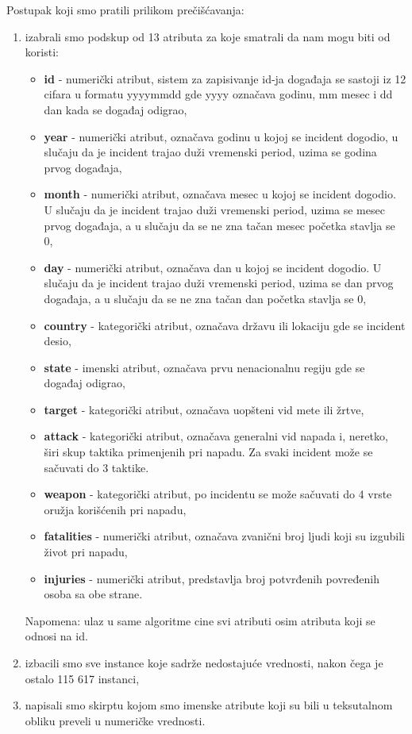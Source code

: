 \documentclass[a4paper]{article}
\begin{document}
Postupak koji smo pratili prilikom prečišćavanja:
\begin{enumerate} 
	\item izabrali smo podskup od 13 atributa za koje smatrali da nam mogu biti od koristi: 
	\begin{itemize}
		\item \textbf{id} - numerički atribut, sistem za zapisivanje id-ja događaja se sastoji iz 12 cifara u formatu yyyymmdd gde yyyy označava godinu, mm mesec i dd dan kada se događaj odigrao,
		\item \textbf{year} - numerički atribut, označava godinu u kojoj se incident dogodio, u slučaju da je incident trajao duži vremenski period, uzima se godina prvog događaja,
		\item \textbf{month} - numerički atribut, označava mesec u kojoj se incident dogodio. U slučaju da je incident trajao duži vremenski period, uzima se mesec prvog događaja, a u slučaju da se ne zna tačan mesec početka stavlja se 0,
		\item \textbf{day} - numerički atribut, označava dan u kojoj se incident dogodio. U slučaju da je incident trajao duži vremenski period, uzima se dan prvog događaja, a u slučaju da se ne zna tačan dan početka stavlja se 0,
		\item \textbf{country} - kategorički atribut, označava državu ili lokaciju gde se incident desio,
		\item \textbf{state} - imenski atribut, označava prvu nenacionalnu regiju gde se događaj odigrao,
		\item \textbf{target} - kategorički atribut, označava uopšteni vid mete ili žrtve,
		\item \textbf{attack} - kategorički atribut, označava generalni vid napada i, neretko, širi skup taktika primenjenih pri napadu. Za svaki incident može se sačuvati do 3 taktike.
		\item \textbf{weapon} - kategorički atribut, po incidentu se može sačuvati do 4 vrste oružja korišćenih pri napadu,
		\item \textbf{fatalities} - numerički atribut, označava zvanični broj ljudi koji su izgubili život pri napadu,
		\item \textbf{injuries} - numerički atribut, predstavlja broj potvrđenih povređenih osoba sa obe strane.\\
	\end{itemize}
	Napomena: ulaz u same algoritme cine svi atributi osim atributa koji se odnosi na id. 
\item izbacili smo sve instance koje sadrže nedostajuće vrednosti, nakon čega je ostalo 115 617 instanci,
\item napisali smo skirptu kojom smo imenske atribute koji su bili u teksutalnom obliku preveli u numeričke vrednosti.

\end{enumerate}
\end{document}
